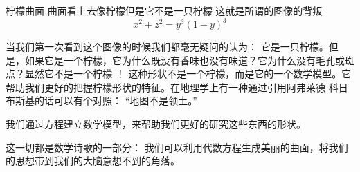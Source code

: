 ﻿\begin{surferPage}{柠檬曲面}
曲面看上去像柠檬但是它不是一只柠檬-这就是所谓的图像的背叛\\
\smallskip
\[x^2 + z^2 = y^3 (1 - y)^3\] 

\singlespacing
当我们第一次看到这个图像的时候我们都毫无疑问的认为： 它是一只柠檬。但是，如果它是一个柠檬，它为什么既没有香味也没有味道？它为什么没有毛孔或斑点？显然它不是一个柠檬 ！
\singlespacing
这种形状不是一个柠檬，而是它的一个数学模型。它帮助我们更好的把握柠檬形状的特征。在地理学上有一种通过引用阿弗莱德 科日布斯基的话可以有个对照： \enquote{地图不是领土。}\\

\singlespacing

我们通过方程建立数学模型，来帮助我们更好的研究这些东西的形状。

\singlespacing

这一切都是数学诗歌的一部分： 我们可以利用代数方程生成美丽的曲面，将我们的思想带到我们的大脑意想不到的角落。
\end{surferPage}
